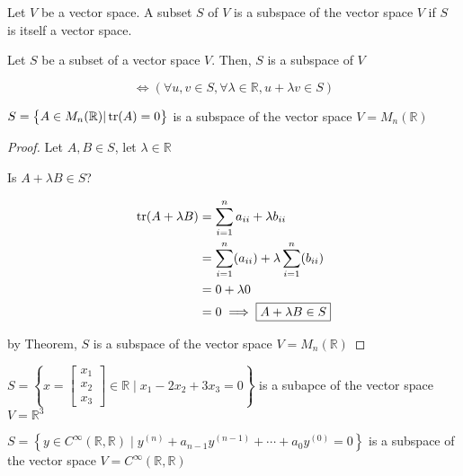 \begin{definition}
	Let $V$ be a vector space. A subset $S$ of $V$ is a subspace of the vector space $V$ if $S$ is itself a vector space.
\end{definition}

\begin{theorem}
	Let $S$ be a subset of a vector space $V$. Then, $S$ is a subspace of $V$

	\begin{equation} \label{eq:subspace}
		\iff \left(\forall u, v \in S, \forall \lambda \in \mathbb{R}, u + \lambda v \in S\right)
	\end{equation}
\end{theorem}

\begin{example}
	$S = \left\{A\in M_n (\mathbb{R}) | \tr(A) = 0\right\}$ is a subspace of the vector space $V=M_n(\mathbb{R})$
\end{example}

\begin{proof}
	Let $A,B \in S$, let $\lambda \in \mathbb{R}$

	Is $A + \lambda B \in S$?

	\begin{align}
		\tr(A + \lambda B) &= \sum_{i=1}^{n} a_{ii} + \lambda b_{ii}\\
		&= \sum_{i=1}^{n} (a_{ii}) + \lambda \sum_{i=1}^{n} (b_{ii})\\
		&= 0 + \lambda 0\\
		&= 0 \implies \boxed{A + \lambda B \in S}
	\end{align}

	by Theorem, $S$ is a subspace of the vector space $V=M_n(\mathbb{R})$
\end{proof}

\begin{example}
	$S = \left\{x = \begin{bmatrix}
		x_1\\x_2\\x_3
	\end{bmatrix} \in \mathbb{R} \mid x_1 -2x_2 +3x_3 = 0\right\}$ is a subapce of the vector space $V = \mathbb{R}^3$
\end{example}

\begin{example}
	$S = \left\{y \in C^{\infty} (\mathbb{R}, \mathbb{R}) \mid y^{(n)} + a_{n-1}y^{(n-1)} + \cdots + a_0 y^{(0)} = 0\right\}$ is a subspace of the vector space $V = C^{\infty}(\mathbb{R}, \mathbb{R})$
\end{example}

